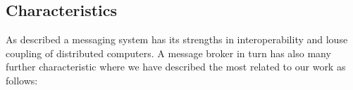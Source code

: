 

\subsection{Characteristics}
\label{intro-messaging-characteristics}
As described a messaging system has its strengths in interoperability and louse
coupling of distributed computers. A message broker in turn has also many further
characteristic where we have described the most related to our work as follows:  

